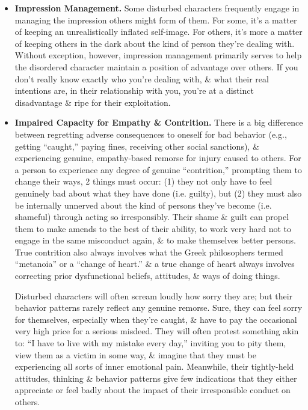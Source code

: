 \documentclass{article}
\numberwithin{equation}{section}
\begin{document}
\begin{itemize}
	\item \textbf{Impression Management.} Some disturbed characters frequently engage in managing the impression others might form of them. For some, it's a matter of keeping an unrealistically inflated self-image. For others, it's more a matter of keeping others in the dark about the kind of person they're dealing with. Without exception, however, impression management primarily serves to help the disordered character maintain a position of advantage over others. If you don't really know exactly who you're dealing with, \& what their real intentions are, in their relationship with you, you're at a distinct disadvantage \& ripe for their exploitation.
	\item \textbf{Impaired Capacity for Empathy \& Contrition.} There is a big difference between regretting adverse consequences to oneself for bad behavior (e.g., getting ``caught,'' paying fines, receiving other social sanctions), \& experiencing genuine, empathy-based remorse for injury caused to others. For a person to experience any degree of genuine ``contrition,'' prompting them to change their ways, 2 things must occur: (1) they not only have to feel genuinely bad about what they have done (i.e. guilty), but (2) they must also be internally unnerved about the kind of persons they've become (i.e. shameful) through acting so irresponsibly. Their shame \& guilt can propel them to make amends to the best of their ability, to work very hard not to engage in the same misconduct again, \& to make themselves better persons. True contrition also always involves what the Greek philosophers termed ``metanoia'' or a ``change of heart.'' \& a true change of heart always involves correcting prior dysfunctional beliefs, attitudes, \& ways of doing things.

	Disturbed characters will often scream loudly how sorry they are; but their behavior patterns rarely reflect any genuine remorse. Sure, they can feel sorry for themselves, especially when they're caught, \& have to pay the occasional very high price for a serious misdeed. They will often protest something akin to: ``I have to live with my mistake every day,'' inviting you to pity them, view them as a victim in some way, \& imagine that they must be experiencing all sorts of inner emotional pain. Meanwhile, their tightly-held attitudes, thinking \& behavior patterns give few indications that they either appreciate or feel badly about the impact of their irresponsible conduct on others.
	

\end{itemize}
\end{document}
